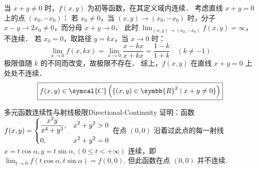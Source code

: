 \begin{solution}

    当 $x + y \neq 0$ 时，$f(x, y)$ 为初等函数，在其定义域内连续．
    考虑直线 $x + y = 0$ 上的点 $(x_0, -x_0)$：
    若 $x_0 \neq 0$，当 $(x, y) \to (x_0, -x_0)$ 时，分子 $x - y \to 2x_0 \neq 0$，而分母 $x + y \to 0$．
    此时 $\lim_{(x, y) \to (x_0, -x_0)} f(x, y) = \infty$，不连续．
    若 $x_0 = 0$，取路径 $y = kx$，当 $x \to 0$ 时：
    \begin{equation}
        \lim_{x \to 0} f(x, kx) = \lim_{x \to 0} \frac{x - kx}{x + kx} = \frac{1 - k}{1 + k} \quad (k \neq -1)
    \end{equation}
    极限值随 $k$ 的不同而改变，故极限不存在．
    综上，$f(x, y)$ 在直线 $x + y = 0$ 上处处不连续．
    \begin{equation}
        \boxed{f(x, y) \in \symcal{C}\left( \{(x, y) \in \symbb{R}^2 \mid x + y \neq 0\} \right)}
    \end{equation}
\end{solution}


\begin{problem}{多元函数连续性与射线极限}{Directional-Continuity}
    证明：函数 $f(x, y) = \begin{dcases} \frac{x^2y}{x^4+y^2}, & x^2+y^2 > 0 \\ 0, & x^2+y^2 = 0 \end{dcases}$ 在点 $(0,0)$ 沿着过此点的每一射线 $x = t \cos \alpha, y = t \sin \alpha, (0 \le t < +\infty)$ 连续，即 $\lim_{t \to 0} f(t \cos \alpha, t \sin \alpha) = f(0,0)$. 但此函数在点 $(0,0)$ 并不连续.
\end{problem}

